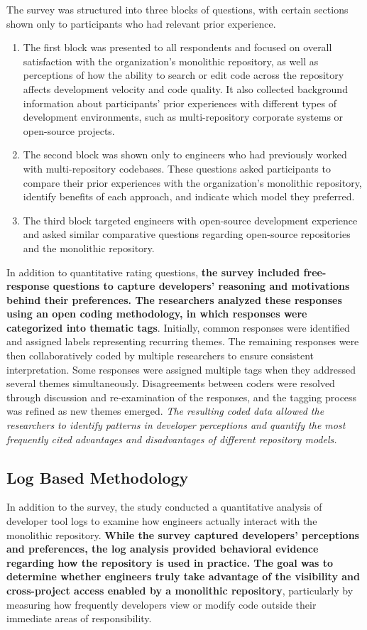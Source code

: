 The survey was structured into three blocks of questions, with certain sections shown only to participants who had relevant prior experience.

\begin{enumerate}
    \item The first block was presented to all respondents and focused on overall satisfaction with the organization's monolithic repository, as well as perceptions of how the ability to search or edit code across the repository affects development velocity and code quality. It also collected background information about participants' prior experiences with different types of development environments, such as multi-repository corporate systems or open-source projects.
    \item The second block was shown only to engineers who had previously worked with multi-repository codebases. These questions asked participants to compare their prior experiences with the organization's monolithic repository, identify benefits of each approach, and indicate which model they preferred.
    \item The third block targeted engineers with open-source development experience and asked similar comparative questions regarding open-source repositories and the monolithic repository.
\end{enumerate}

In addition to quantitative rating questions, \textbf{the survey included free-response questions to capture developers' reasoning and motivations behind their preferences. The researchers analyzed these responses using an open coding methodology, in which responses were categorized into thematic tags}. Initially, common responses were identified and assigned labels representing recurring themes. The remaining responses were then collaboratively coded by multiple researchers to ensure consistent interpretation. Some responses were assigned multiple tags when they addressed several themes simultaneously. Disagreements between coders were resolved through discussion and re-examination of the responses, and the tagging process was refined as new themes emerged. \textit{The resulting coded data allowed the researchers to identify patterns in developer perceptions and quantify the most frequently cited advantages and disadvantages of different repository models.}

\subsection{Log Based Methodology}
In addition to the survey, the study conducted a quantitative analysis of developer tool logs to examine how engineers actually interact with the monolithic repository. \textbf{While the survey captured developers' perceptions and preferences, the log analysis provided behavioral evidence regarding how the repository is used in practice. The goal was to determine whether engineers truly take advantage of the visibility and cross-project access enabled by a monolithic repository}, particularly by measuring how frequently developers view or modify code outside their immediate areas of responsibility.

